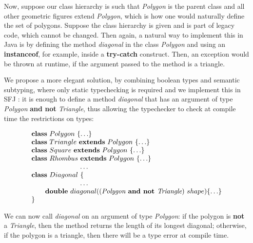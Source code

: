 \documentclass[runningheads]{llncs}
\begin{document}
\begin{example}[Polygons]
    Now, suppose our class hierarchy is such that \emph{Polygon} is the parent class and all other geometric figures extend \emph{Polygon}, which is how one would naturally define the set of polygons.
    Suppose the class hierarchy is given and is part of legacy code, which cannot be changed.
    Then again, a natural way to implement this in Java is by defining the method \emph{diagonal} in the class \emph{Polygon} and using an \textbf{instanceof}, for example, inside a \textbf{try-catch} construct.
    Then, an exception would be thrown at runtime, if the argument passed to the method is a triangle.

    We propose a more elegant solution, by combining boolean types and semantic subtyping, where only static typechecking is required and we implement this in SFJ \cite{UD20}: it is enough to define a method \emph{diagonal} that has an argument of type \emph{Polygon} \textbf{and not} \emph{Triangle}, thus allowing the typechecker to check at compile time the restrictions on types:

    \begin{equation*}
        \begin{array}{l}
            \mathbf{class} \  Polygon \ \{\ldots\}
            \\
            \mathbf{class} \  Triangle \ \mathbf{extends }\  Polygon\ \{\ldots\}
            \\
            \mathbf{class} \  Square \ \mathbf{extends }\  Polygon\ \{\ldots\}
            \\
            \mathbf{class} \  Rhombus \ \mathbf{extends }\  Polygon\ \{\ldots\}
            \\
            \hspace{2.5cm} \ldots
            \\
            \mathbf{class} \  Diagonal \ \{
            \\
            \hspace{2.5cm} \ldots \\
            \qquad \mathbf{double}\ diagonal((\textit{Polygon} \textbf{ and not }  \textit{Triangle}) \ shape)\{\ldots\}
            \\
            \}
        \end{array}
    \end{equation*}

    We can now call \emph{diagonal} on an argument of type \emph{Polygon}: if the polygon is \textbf{not} a \emph{Triangle}, then the method returns the length of its longest diagonal; otherwise, if the polygon is a triangle, then there will be a type error at compile time.
\end{example}
\end{document}
